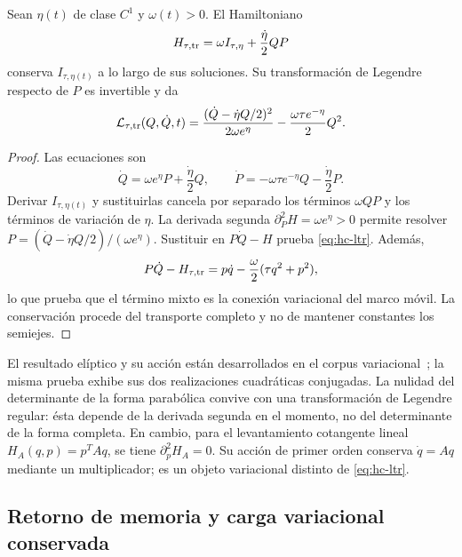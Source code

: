 \begin{theorem}
\label{thm:hc-legendre}
Sean \(\eta(t)\) de clase \(C^1\) y \(\omega(t)>0\). El Hamiltoniano
\begin{equation}
 H_{\tau,\rm tr}
 =\omega I_{\tau,\eta}+\frac{\dot\eta}{2}QP
 \label{eq:hc-htr}
\end{equation}
conserva \(I_{\tau,\eta(t)}\) a lo largo de sus soluciones. Su
transformación de Legendre respecto de \(P\) es invertible y da
\begin{equation}
 \mathcal L_{\tau,\rm tr}(Q,\dot Q,t)
 =\frac{(\dot Q-\dot\eta Q/2)^2}{2\omega e^\eta}
 -\frac{\omega\tau e^{-\eta}}2Q^2.
 \label{eq:hc-ltr}
\end{equation}
\end{theorem}
\begin{proof}
Las ecuaciones son
\[
 \dot Q=\omega e^\eta P+\frac{\dot\eta}2Q,
 \qquad
 \dot P=-\omega\tau e^{-\eta}Q-\frac{\dot\eta}2P.
\]
Derivar \(I_{\tau,\eta(t)}\) y sustituirlas cancela por separado
los términos \(\omega QP\) y los términos de variación de \(\eta\).
La derivada segunda \(\partial_P^2H=\omega e^\eta>0\)
permite resolver
\(P=(\dot Q-\dot\eta Q/2)/(\omega e^\eta)\).
Sustituir en \(P\dot Q-H\) prueba \eqref{eq:hc-ltr}.
Además,
\[
 P\dot Q-H_{\tau,\rm tr}
 =p\dot q-\frac\omega2(\tau q^2+p^2),
\]
lo que prueba que el término mixto es la conexión variacional del marco
móvil. La conservación procede del transporte completo y no de mantener
constantes los semiejes.
\end{proof}

El resultado elíptico y su acción están desarrollados en el corpus
variacional~\cite{hmtX}; la misma prueba exhibe sus dos realizaciones
cuadráticas conjugadas. La nulidad del determinante de la forma parabólica
convive con una transformación de Legendre regular: ésta depende de la
derivada segunda en el momento, no del determinante de la forma completa.
En cambio, para el levantamiento cotangente lineal
\(H_A(q,p)=p^TAq\), se tiene \(\partial_p^2H_A=0\).
Su acción de primer orden conserva \(\dot q=Aq\) mediante un
multiplicador; es un objeto variacional distinto de
\eqref{eq:hc-ltr}.

\subsection{Retorno de memoria y carga variacional conservada}

